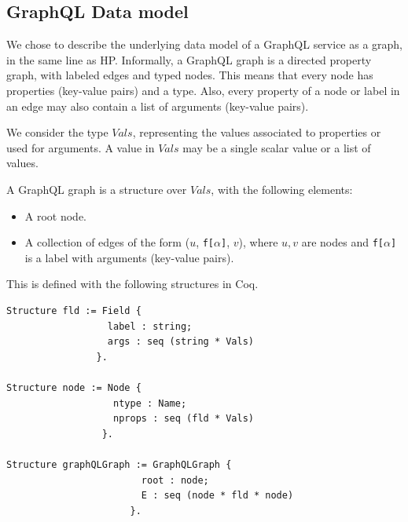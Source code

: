 \subsection{GraphQL Data model}

We chose to describe the underlying data model of a GraphQL service as a graph, in the same line as HP. Informally, a GraphQL graph is a directed property graph, with labeled edges and typed nodes. This means that every node has properties (key-value pairs) and a type. Also, every property of a node or label in an edge may also contain a list of arguments (key-value pairs). 

We consider the type $Vals$, representing the values associated to properties or used for arguments. A value in $Vals$ may be a single scalar value or a list of values.

\begin{definition}
A GraphQL graph is a structure over $Vals$, with the following elements:
\begin{itemize}
    \item A root node.
    \item A collection of edges of the form ($u$, \texttt{f[}$\alpha$\texttt{]}, $v$), where $u, v$ are nodes and \texttt{f[}$\alpha$\texttt{]} is a label with arguments (key-value pairs).
\end{itemize}
\end{definition}

This is defined with the following structures in Coq.

\begin{verbatim}
Structure fld := Field {
                  label : string;
                  args : seq (string * Vals)
                }.
                
Structure node := Node {
                   ntype : Name;
                   nprops : seq (fld * Vals)
                 }.
                 
Structure graphQLGraph := GraphQLGraph {
                        root : node;
                        E : seq (node * fld * node)
                      }.
\end{verbatim}

